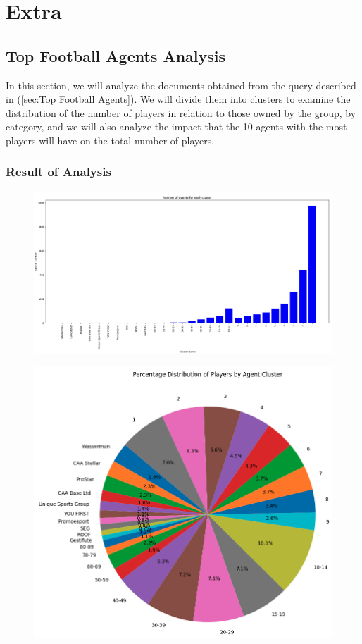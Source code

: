 \documentclass{Configuration_Files/PoliMi3i_thesis}
\begin{document}
\chapter{Extra}
\section{Top Football Agents Analysis}
In this section, we will analyze the documents obtained from the query described in (\ref{sec:Top Football Agents}). We will divide them into clusters to examine the distribution of the number of players in relation to those owned by the group, by category, and we will also analyze the impact that the 10 agents with the most players will have on the total number of players.
\subsection{Result of Analysis}
\begin{figure}[htbp]
  \centering
  \includegraphics[scale=0.27]{Images/Top Football Agents Extra/Histogram.png}
\end{figure}
\newpage
\begin{figure}[htbp]
  \centering
  \includegraphics[scale=0.4]{Images/Top Football Agents Extra/pie_chart.png}
\end{figure}
\end{document}
